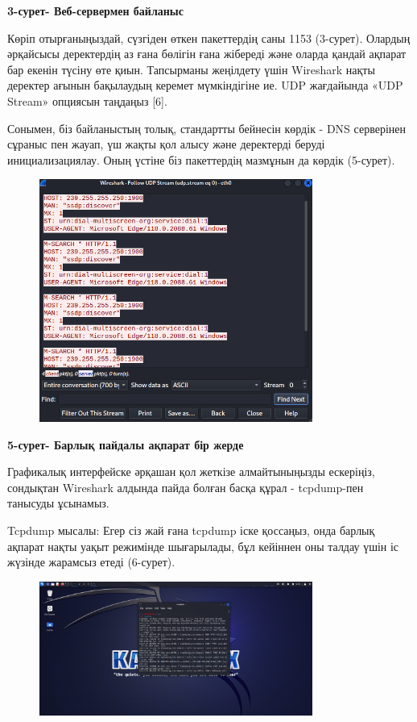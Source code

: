 {\bfseries 3-сурет- Веб-сервермен байланыс}

Көріп отырғаныңыздай, сүзгіден өткен пакеттердің саны 1153 (3-сурет).
Олардың әрқайсысы деректердің аз ғана бөлігін ғана жібереді және оларда
қандай ақпарат бар екенін түсіну өте қиын. Тапсырманы жеңілдету үшін
Wireshark нақты деректер ағынын бақылаудың керемет мүмкіндігіне ие. UDP
жағдайында «UDP Stream» опциясын таңдаңыз {[}6{]}.

Сонымен, біз байланыстың толық, стандартты бейнесін көрдік - DNS
серверінен сұраныс пен жауап, үш жақты қол алысу және деректерді беруді
инициализациялау. Оның үстіне біз пакеттердің мазмұнын да көрдік
(5-сурет).

\begin{figure}[H]
	\centering
	\includegraphics[width=0.8\textwidth]{assets/29}
	\caption*{}
\end{figure}

{\bfseries 5-сурет- Барлық пайдалы ақпарат бір жерде}

Графикалық интерфейске әрқашан қол жеткізе алмайтыныңызды ескеріңіз,
сондықтан Wireshark алдында пайда болған басқа құрал - tcpdump-пен
танысуды ұсынамыз.

Tcpdump мысалы: Егер сіз жай ғана tcpdump іске қоссаңыз, онда барлық
ақпарат нақты уақыт режимінде шығарылады, бұл кейіннен оны талдау үшін
іс жүзінде жарамсыз етеді (6-сурет).

\begin{figure}[H]
	\centering
	\includegraphics[width=0.8\textwidth]{assets/30}
	\caption*{}
\end{figure}

